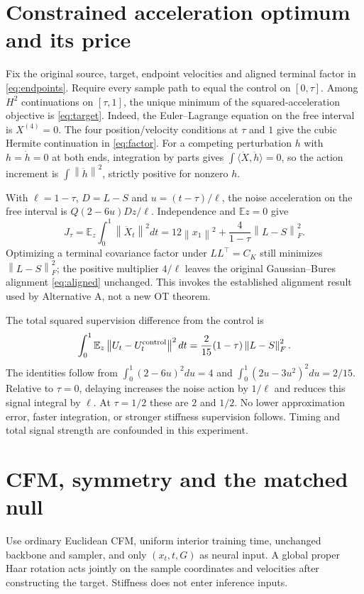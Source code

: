 \documentclass[11pt]{article}
\newcommand{\E}{\mathbb E}
\newcommand{\norm}[1]{\left\lVert#1\right\rVert}
\begin{document}
\section{Constrained acceleration optimum and its price}
Fix the original source, target, endpoint velocities and aligned terminal
factor in \eqref{eq:endpoints}. Require every sample path to equal the
control on $[0,\tau]$. Among $H^2$ continuations on $[\tau,1]$, the unique
minimum of the squared-acceleration objective is \eqref{eq:target}.
Indeed, the Euler--Lagrange equation on the free interval is $X^{(4)}=0$.
The four position/velocity conditions at $\tau$ and $1$ give the cubic
Hermite continuation in \eqref{eq:factor}. For a competing perturbation $h$
with $h=\dot h=0$ at both ends, integration by parts gives
$\int\langle\ddot X,\ddot h\rangle=0$, so the action increment is
$\int\norm{\ddot h}^2$, strictly positive for nonzero $h$.

With $\ell=1-\tau$, $D=L-S$ and $u=(t-\tau)/\ell$, the noise acceleration
on the free interval is $Q(2-6u)Dz/\ell$. Independence and $\E z=0$ give
\begin{equation}
 J_\tau=\E_z\int_0^1\norm{\ddot X_t}^2dt
 =12\norm{x_1}^2+\frac4{1-\tau}\norm{L-S}_F^2.
 \label{eq:action}
\end{equation}
Optimizing a terminal covariance factor under $LL^\top=C_K$ still minimizes
$\norm{L-S}_F^2$; the positive multiplier $4/\ell$ leaves the original
Gaussian--Bures alignment \eqref{eq:aligned} unchanged. This invokes the
established alignment result used by Alternative A, not a new OT theorem.

The total squared supervision difference from the control is
\begin{equation}
 \int_0^1\E_z\norm{U_t-U_t^{\rm control}}^2dt
 =\frac2{15}(1-\tau)\norm{L-S}_F^2.
 \label{eq:signal}
\end{equation}
The identities follow from
$\int_0^1(2-6u)^2du=4$ and
$\int_0^1(2u-3u^2)^2du=2/15$.
Relative to $\tau=0$, delaying increases the noise action by $1/\ell$ and
reduces this signal integral by $\ell$. At $\tau=1/2$ these are $2$ and
$1/2$. No lower approximation error, faster integration, or stronger
stiffness supervision follows. Timing and total signal strength are
confounded in this experiment.

\section{CFM, symmetry and the matched null}
Use ordinary Euclidean CFM, uniform interior training time, unchanged
backbone and sampler, and only $(x_t,t,G)$ as neural input. A global proper
Haar rotation acts jointly on the sample coordinates and velocities after
constructing the target. Stiffness does not enter inference inputs.
\end{document}
